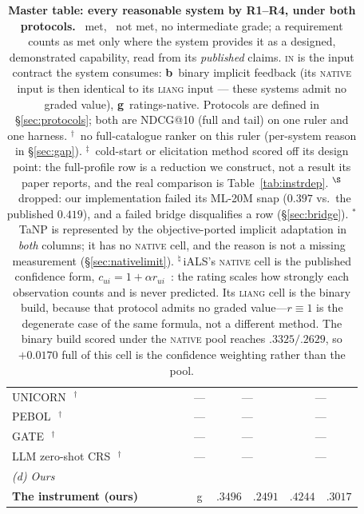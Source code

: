\documentclass[11pt]{article}
\newcommand{\cmark}{\ding{51}}
\newcommand{\xmark}{\ding{55}}
\begin{document}
\begin{table}[!htbp]
\begin{tabular}{p{4.9cm}cccc c r@{\,/\,}l r@{\,/\,}l}
UNICORN~\cite{deng2021unicorn}\,$^{\dagger}$ & \xmark & \xmark & \xmark & \xmark & --- & \multicolumn{2}{c}{---} & \multicolumn{2}{c}{---} \\
PEBOL~\cite{austin2024bayesian}\,$^{\dagger}$ & \xmark & \cmark & \xmark & \xmark & --- & \multicolumn{2}{c}{---} & \multicolumn{2}{c}{---} \\
GATE~\cite{li2023eliciting}\,$^{\dagger}$ & \xmark & \cmark & \xmark & \cmark & --- & \multicolumn{2}{c}{---} & \multicolumn{2}{c}{---} \\
LLM zero-shot CRS~\cite{he2023large}\,$^{\dagger}$ & \xmark & \cmark & \xmark & \cmark & --- & \multicolumn{2}{c}{---} & \multicolumn{2}{c}{---} \\
\midrule
\multicolumn{10}{l}{\emph{(d) Ours}}\\
\textbf{The instrument (ours)} & \cmark & \cmark & \cmark & \cmark & g & $\mathbf{.3496}$ & $\mathbf{.2491}$ & $\mathbf{.4244}$ & $\mathbf{.3017}$ \\
\bottomrule
\end{tabular}
\caption{\textbf{Master table: every reasonable system by R1--R4, under both protocols.} \cmark~met,
\xmark~not met, no intermediate grade; a requirement counts as met only where the system provides it as a
designed, demonstrated capability, read from its \emph{published} claims. \textsc{in} is the input contract the
system consumes: \textbf{b}~binary implicit feedback (its \textsc{native} input is then identical to its
\textsc{liang} input --- these systems admit no graded value), \textbf{g}~ratings-native. Protocols are defined
in \S\ref{sec:protocols}; both are NDCG@10 (full and tail) on one ruler and one harness.
$^{\dagger}$~no full-catalogue ranker on this ruler (per-system reason in \S\ref{sec:gap}).
$^{\ddagger}$~cold-start or elicitation method scored off its design point: the full-profile row is a reduction we
construct, not a result its paper reports, and the real comparison is Table~\ref{tab:instrdep}.
$^{\S}$~dropped: our implementation failed its ML-20M snap ($0.397$ vs.\ the published $0.419$), and a failed
bridge disqualifies a row (\S\ref{sec:bridge}). $^{\ast}$\,TaNP is represented by the objective-ported implicit adaptation in \emph{both} columns; it has no
\textsc{native} cell, and the reason is not a missing measurement (\S\ref{sec:nativelimit}).
$^{\natural}$\,iALS's \textsc{native} cell is the published confidence form, $c_{ui}=1+\alpha r_{ui}$~\cite{hu2008collaborative}: the rating scales how strongly each observation counts and is never predicted. Its \textsc{liang} cell is the binary build, because that protocol admits no graded value---$r\equiv1$ is the degenerate case of the same formula, not a different method. The binary build scored under the \textsc{native} pool reaches $.3325/.2629$, so $+0.0170$ full of this cell is the confidence weighting rather than the pool.
}
\end{table}
\end{document}
